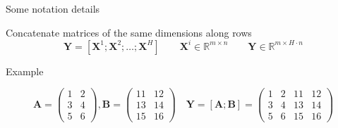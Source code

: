 \documentclass[12pt,aspectratio=169,handout]{beamer}
\begin{document}
\begin{frame}{Some notation details}
	
	Concatenate matrices of the same dimensions along rows
	$$\bm{Y} = [\bm{X}^1 ; \bm{X}^2 ; \ldots ; \bm{X}^H]
	\qquad
	\bm{X}^i \in \mathbb{R}^{m \times n}
	\qquad
	\bm{Y} \in \mathbb{R}^{m \times H \cdot n}$$
	
	\begin{block}{Example}
		\begin{small}
			$$
			\bm{A} =
			\begin{pmatrix}
				1 & 2 \\
				3 & 4 \\
				5 & 6
			\end{pmatrix}
			,
			\bm{B} =
			\begin{pmatrix}
				11 & 12 \\
				13 & 14 \\
				15 & 16
			\end{pmatrix}
			\quad
			\bm{Y} = [\bm{A} ; \bm{B} ] =
			\begin{pmatrix}
				1 & 2 & 11 & 12 \\
				3 & 4 & 13 & 14 \\
				5 & 6 & 15 & 16
			\end{pmatrix}
			$$
		\end{small}
	\end{block}
	
	
\end{frame}
\end{document}
